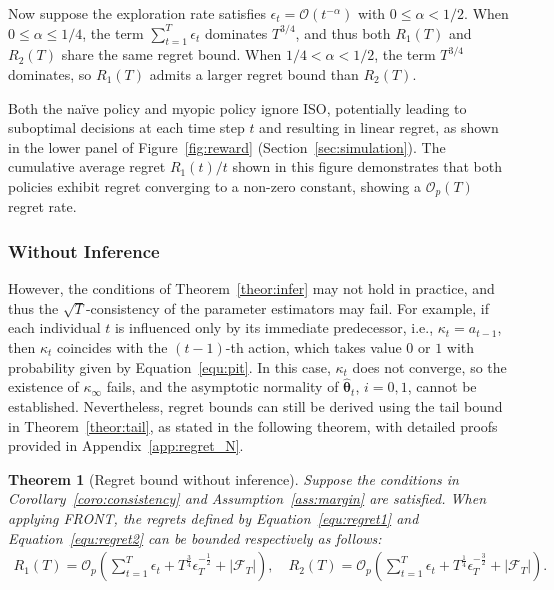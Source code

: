 \documentclass[12pt]{article}
\newtheorem{theorem}{Theorem}
\begin{document}
Now suppose the exploration rate satisfies $\epsilon_t = \mathcal{O}(t^{-\alpha})$ with $0 \le \alpha < 1/2$. When $0 \le \alpha \le 1/4$, the term $\sum_{t=1}^T \epsilon_t$ dominates $T^{3/4}$, and thus both $R_1(T)$ and $R_2(T)$ share the same regret bound. When $1/4 < \alpha < 1/2$, the term $T^{3/4}$ dominates, so $R_1(T)$ admits a larger regret bound than $R_2(T)$.  

Both the na\"ive policy and myopic policy ignore ISO, potentially leading to suboptimal decisions at each time step $t$ and resulting in linear regret, as shown in the lower panel of Figure~\ref{fig:reward} (Section~\ref{sec:simulation}). The cumulative average regret $R_1(t)/t$ shown in this figure demonstrates that both policies exhibit regret converging to a non-zero constant, showing a $\mathcal{O}_p(T)$ regret rate. 


\subsubsection{Without Inference}
\label{sec:noinfer_regret}
However, the conditions of Theorem~\ref{theor:infer} may not hold in practice, and thus the $\sqrt{T}$-consistency of the parameter estimators may fail. For example, if each individual $t$ is influenced only by its immediate predecessor, i.e., $\kappa_t = a_{t-1}$, then $\kappa_t$ coincides with the $(t-1)$-th action, which takes value $0$ or $1$ with probability given by Equation~\eqref{equ:pit}. In this case, $\kappa_t$ does not converge, so the existence of $\kappa_\infty$ fails, and the asymptotic normality of $\widehat{\bm{\theta}}_{t}$, $i=0,1$, cannot be established. Nevertheless, regret bounds can still be derived using the tail bound in Theorem~\ref{theor:tail}, as stated in the following theorem, with detailed proofs provided in Appendix~\ref{app:regret_N}.

\begin{theorem}[Regret bound without inference]
\label{theor:regret_N}
Suppose the conditions in Corollary~\ref{coro:consistency} and Assumption~\ref{ass:margin} are satisfied. When applying FRONT, the regrets defined by Equation~\eqref{equ:regret1} and Equation~\eqref{equ:regret2} can be bounded respectively as follows:
\begin{align*}
    R_1(T) = \mathcal{O}_p\left(\sum_{t=1}^T \epsilon_t + T^{\frac{3}{4}} \epsilon_T^{-\tfrac{1}{2}}+|\mathcal{F}_T|\right), \quad
    R_2(T) = \mathcal{O}_p\left(\sum_{t=1}^T \epsilon_t + T^{\tfrac{1}{4}} \epsilon_T^{-\tfrac{3}{2}} + |\mathcal{F}_T|\right).
\end{align*}
\end{theorem}
\end{document}
